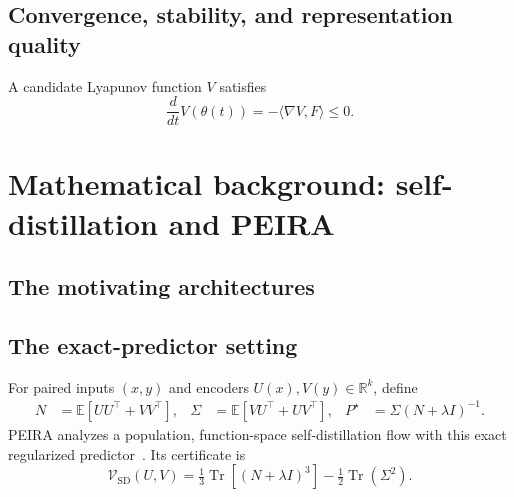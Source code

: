 \documentclass[11pt,a4paper]{article}
\newcommand{\Tr}{\operatorname{Tr}}
\newcommand{\E}{\mathbb{E}}
\newcommand{\R}{\mathbb{R}}
\newif\ifdraftnotes
\newcommand{\draftnote}[1]{\ifdraftnotes\par\smallskip
  {\small\color{gray}\noindent\textit{To develop:} #1\par}\smallskip\fi}
\begin{document}
\subsection{Convergence, stability, and representation quality}
A candidate Lyapunov function $V$ satisfies
\[
 \frac{d}{dt}V(\theta(t))=-\langle\nabla V,F\rangle\leq 0.
\]
\draftnote{Distinguish a potential, a Lyapunov function, and an invariant.
State the additional boundedness, strictness, or analytic assumptions needed
for the particular convergence claim. An invariant alone does not exclude
cycles; convergence alone does not exclude collapse. Keep collapse stability
and Nash properties model-dependent.}

\section{Mathematical background: self-distillation and PEIRA}
\label{sec:peira}
\subsection{The motivating architectures}
\draftnote{Define views, encoder, predictor, target, and collapse. Explain the
shared stopped target in SimSiam and the EMA target in BYOL. Then introduce
the idealized model analyzed by PEIRA, distinguishing it from the full
architectures and their practical training procedures.}

\subsection{The exact-predictor setting}
For paired inputs $(x,y)$ and encoders $U(x),V(y)\in\R^k$, define
\begin{align}
 N&=\E[UU^\top+VV^\top], &
 \Sigma&=\E[VU^\top+UV^\top], &
 P^\star&=\Sigma(N+\lambda I)^{-1}.
\end{align}
PEIRA analyzes a population, function-space self-distillation flow with
this exact regularized predictor~\cite{peira}. Its certificate is
\begin{equation}
 \mathcal V_{\mathrm{SD}}(U,V)
 =\tfrac13\Tr[(N+\lambda I)^3]-\tfrac12\Tr(\Sigma^2).
\end{equation}
\draftnote{Write the directed regularized prediction losses and the exact
semi-gradient equations. State the spectral assumptions and explain nonlinear
CCA. Summarize convergence and equilibrium classification separately from
stability; the analyzed self-distillation system permits stable collapse.}
\end{document}
